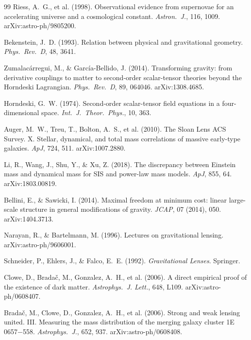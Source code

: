 \documentclass[12pt,a4paper]{article}
\begin{document}
\begin{thebibliography}{99}
  Riess, A.~G., et al. (1998).
  Observational evidence from supernovae for an accelerating universe and a
  cosmological constant.
  \textit{Astron.\ J.}, 116, 1009.
  arXiv:astro-ph/9805200.

  Bekenstein, J.~D. (1993).
  Relation between physical and gravitational geometry.
  \textit{Phys.\ Rev.\ D}, 48, 3641.

  Zumalacárregui, M., \& García-Bellido, J. (2014).
  Transforming gravity: from derivative couplings to matter to second-order
  scalar-tensor theories beyond the Horndeski Lagrangian.
  \textit{Phys.\ Rev.\ D}, 89, 064046.
  arXiv:1308.4685.

  Horndeski, G.~W. (1974).
  Second-order scalar-tensor field equations in a four-dimensional space.
  \textit{Int.\ J.\ Theor.\ Phys.}, 10, 363.

  Auger, M.~W., Treu, T., Bolton, A.~S., et al. (2010).
  The Sloan Lens ACS Survey. X. Stellar, dynamical, and total mass
  correlations of massive early-type galaxies.
  \textit{ApJ}, 724, 511. arXiv:1007.2880.

  Li, R., Wang, J., Shu, Y., \& Xu, Z. (2018).
  The discrepancy between Einstein mass and dynamical mass for SIS and
  power-law mass models.
  \textit{ApJ}, 855, 64. arXiv:1803.00819.

  Bellini, E., \& Sawicki, I. (2014).
  Maximal freedom at minimum cost: linear large-scale structure in general
  modifications of gravity.
  \textit{JCAP}, 07 (2014), 050. arXiv:1404.3713.

  Narayan, R., \& Bartelmann, M. (1996).
  Lectures on gravitational lensing.
  arXiv:astro-ph/9606001.

  Schneider, P., Ehlers, J., \& Falco, E.~E. (1992).
  \textit{Gravitational Lenses}.
  Springer.

  Clowe, D., Bradač, M., Gonzalez, A.~H., et al. (2006).
  A direct empirical proof of the existence of dark matter.
  \textit{Astrophys.\ J. Lett.}, 648, L109.
  arXiv:astro-ph/0608407.

  Bradač, M., Clowe, D., Gonzalez, A.~H., et al. (2006).
  Strong and weak lensing united. III. Measuring the mass distribution of
  the merging galaxy cluster 1E 0657$-$558.
  \textit{Astrophys.\ J.}, 652, 937.
  arXiv:astro-ph/0608408.


\end{thebibliography}
\end{document}

